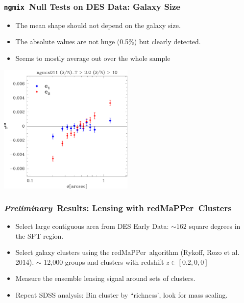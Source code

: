 \documentclass{beamer}
\newcommand{\ngmix}{\texttt{ngmix}}
\newcommand{\redmapper}{redMaPPer}
\newcommand{\prelim}{{\bf{\it Preliminary}}}
\begin{document}
\frame
{
    \frametitle{\ngmix\ Null Tests on DES Data: Galaxy Size}

    \begin{itemize}

        \item The mean shape should not depend on the galaxy size.

        \item The absolute values are not huge (0.5\%) but clearly detected.
        
        \item Seems to mostly average out over the whole sample

    \end{itemize}


    \begin{center}
        \includegraphics[width=0.5\textwidth]{ngmix011-e-vs-sigma-mx-50-Ts2n-min-300-s2n-min-10.pdf}
    \end{center}

}



\frame
{
    \frametitle{\prelim\ Results: Lensing with \redmapper\ Clusters}
    
    \begin{itemize}

        \item Select large contiguous area from DES Early Data: $\sim 162$ square degrees
            in the SPT region.

        \item Select galaxy clusters using the \redmapper\ algorithm (Rykoff,
            Rozo et al. 2014).  $\sim$ 12,000 groups and clusters with redshift
            $z \in [0.2,0,0]$

        \item Measure the ensemble lensing signal around sets of clusters.

        \item Repeat SDSS analysis: Bin cluster by ``richness', look for mass scaling.

    \end{itemize}
}
\end{document}
